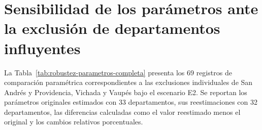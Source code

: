 \clearpage


\section{Sensibilidad de los parámetros ante la exclusión de departamentos influyentes}
\label{sec:apendice-influencia-parametros}

La Tabla~\ref{tab:robustez-parametros-completa} presenta los 69 registros de comparación paramétrica correspondientes a las exclusiones individuales de San Andrés y Providencia, Vichada y Vaupés bajo el escenario E2. Se reportan los parámetros originales estimados con 33 departamentos, sus reestimaciones con 32 departamentos, las diferencias calculadas como el valor reestimado menos el original y los cambios relativos porcentuales.

\begingroup
\scriptsize
\setlength{\tabcolsep}{2.8pt}
\renewcommand{\arraystretch}{1.06}


